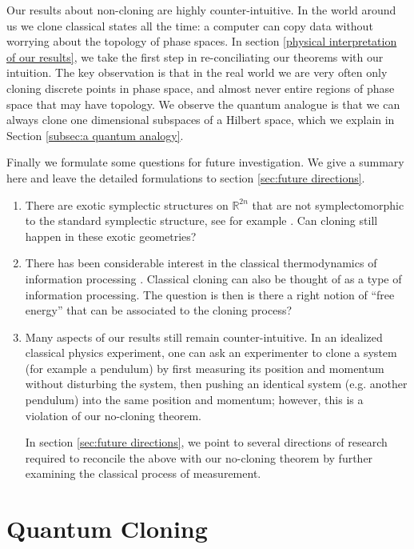 \documentclass[jmp,amsmath,amssymb]{revtex4-1}
\theoremstyle{plain}
\begin{document}
Our results about non-cloning are highly counter-intuitive. In the  world around us we clone classical states all the time: a computer can copy data without worrying about the topology of phase spaces. In section \ref{physical interpretation of our results}, we take the first step in re-conciliating our theorems with our intuition. The key observation is that in the real world we are very often only cloning discrete points in phase space, and almost never entire regions of phase space that may have topology. We observe the quantum analogue is that we can always clone one dimensional subspaces of a Hilbert space, which we explain in Section \ref{subsec:a quantum analogy}.


Finally we formulate some questions for future investigation. We give a summary here and leave the detailed formulations to section \ref{sec:future directions}.

\begin{enumerate}
\item There are exotic symplectic structures on $\mathbb{R}^{2n}$ that are not symplectomorphic to the standard symplectic structure, see for example \cite{exotic_symplectic}. Can cloning still happen in these exotic geometries?
\item There has been considerable interest in the classical thermodynamics of information processing \cite{information_thermo,landauer,thermodynamics_of_feedback_controlled_systems}. Classical cloning can also be thought of as a type of information processing. The question is then is there a right notion of ``free energy'' that can be associated to the cloning process?
\item Many aspects of our results still remain counter-intuitive. In an idealized classical physics experiment, one can ask an experimenter to clone a system (for example a pendulum) by first measuring its position and momentum without disturbing the system, then pushing an identical system (e.g. another pendulum) into the same position and momentum; however, this is a violation of our no-cloning theorem.

In section \ref{sec:future directions}, we point to several directions of research required to reconcile the above with our no-cloning theorem by further examining the classical process of measurement.
\end{enumerate}
\section{Quantum Cloning}\label{sec:quantum cloning}
\end{document}
